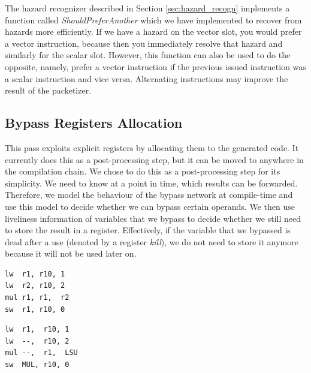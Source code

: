 The hazard recognizer described in Section \ref{sec:hazard_recogn} implements a function called \emph{ShouldPreferAnother} which we have implemented to recover from hazards more efficiently. If we have a hazard on the vector slot, you would prefer a vector instruction, because then you immediately resolve that hazard and similarly for the scalar slot. However, this function can also be used to do the opposite, namely, prefer a vector instruction if the previous issued instruction was a scalar instruction and vice versa. Alternating instructions may improve the result of the packetizer. 

\subsection{Bypass Registers Allocation}
This pass exploits explicit registers by allocating them to the generated code. It currently does this as a post-processing step, but it can be moved to anywhere in the compilation chain. We chose to do this as a post-processing step for its simplicity. We need to know at a point in time, which results can be forwarded. Therefore, we model the behaviour of the bypass network at compile-time and use this model to decide whether we can bypass certain operands. We then use liveliness information of variables that we bypass to decide whether we still need to store the result in a register. Effectively, if the variable that we bypassed is dead after a use (denoted by a register \emph{kill}), we do not need to store it anymore because it will not be used later on. 

\label{lst:explicit_reg_alloc}
\begin{center}
\hspace{2px}\begin{minipage}{.475\textwidth}
\begin{lstlisting}[frame=tlrb]
lw  r1, r10, 1
lw  r2, r10, 2
mul r1, r1,  r2
sw  r1, r10, 0
\end{lstlisting}
\end{minipage}\hfill
\begin{minipage}{.475\textwidth}
\begin{lstlisting}[frame=tlrb]
lw  r1,  r10, 1
lw  --,  r10, 2
mul --,  r1,  LSU
sw  MUL, r10, 0
\end{lstlisting}
\end{minipage}
\end{center}

